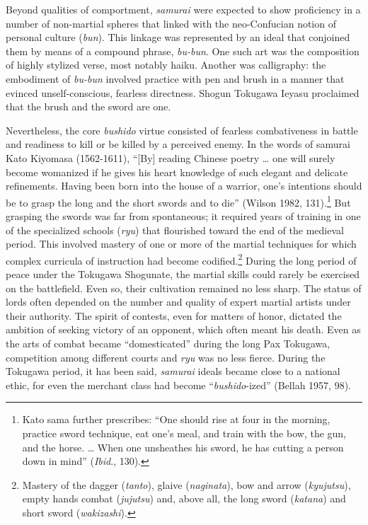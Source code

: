 Beyond qualities of comportment, \emph{samurai} were expected to show proficiency in a number of non-martial spheres that linked with the neo-Confucian notion of personal culture (\emph{bun}). This linkage was represented by an ideal that conjoined them by means of a compound phrase, \emph{bu-bun}. One such art was the composition of highly stylized verse, most notably haiku. Another was calligraphy: the embodiment of \emph{bu-bun} involved practice with pen and brush in a manner that evinced unself-conscious, fearless directness. Shogun Tokugawa Ieyasu proclaimed that the brush and the sword are one.

Nevertheless, the core \emph{bushido} virtue consisted of fearless combativeness in battle and readiness to kill or be killed by a perceived enemy. In the words of samurai Kato Kiyomasa (1562-1611), ``[By] reading Chinese poetry \ldots{} one will surely become womanized if he gives his heart knowledge of such elegant and delicate refinements. Having been born into the house of a warrior, one's intentions should be to grasp the long and the short swords and to die'' (Wilson 1982, 131).\footnote{Kato sama further prescribes: ``One should rise at four in the morning, practice sword technique, eat one's meal, and train with the bow, the gun, and the horse. \ldots{} When one unsheathes his sword, he has cutting a person down in mind'' (\emph{Ibid}., 130).} But grasping the swords was far from spontaneous; it required years of training in one of the specialized schools (\emph{ryu}) that flourished toward the end of the medieval period. This involved mastery of one or more of the martial techniques for which complex curricula of instruction had become codified.\footnote{Mastery of the dagger (\emph{tanto}), glaive (\emph{naginata}), bow and arrow (\emph{kyujutsu}), empty hands combat (\emph{jujutsu}) and, above all, the long sword (\emph{katana}) and short sword (\emph{wakizashi}).} During the long period of peace under the Tokugawa Shogunate, the martial skills could rarely be exercised on the battlefield. Even so, their cultivation remained no less sharp. The status of lords often depended on the number and quality of expert martial artists under their authority. The spirit of contests, even for matters of honor, dictated the ambition of seeking victory of an opponent, which often meant his death. Even as the arts of combat became ``domesticated'' during the long Pax Tokugawa, competition among different courts and \emph{ryu} was no less fierce. During the Tokugawa period, it has been said, \emph{samurai} ideals became close to a national ethic, for even the merchant class had become ``\emph{bushido}-ized'' (Bellah 1957, 98). 

